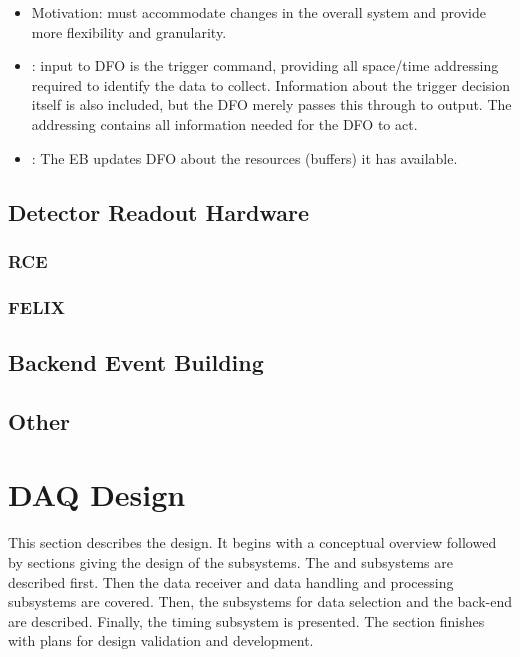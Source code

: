 \begin{itemize}
\item Motivation: must accommodate changes in the overall system and provide more flexibility and granularity.
\item {}: input to DFO is the trigger command, providing all space/time addressing required to identify the data to collect.  Information about the trigger decision itself is also included, but the DFO merely passes this through to output.  The addressing contains all information needed for the DFO to act.
\item {}: The EB updates DFO about the resources (buffers) it has available.
\end{itemize}

\subsection{Detector Readout Hardware}


\subsubsection{RCE}

\subsubsection{FELIX}

\subsection{Backend Event Building}

\subsection{Other}

\section{DAQ Design}
\label{sec:fd-daq:design}


This section describes the  design. 
It begins with a conceptual overview followed by sections giving the design of the  subsystems. 
The  and  subsystems are described first.
Then the  data receiver and data handling and processing subsystems are covered.
Then, the subsystems for data selection and the  back-end are described. Finally, the timing subsystem is presented. The section finishes with plans for design validation and development.


